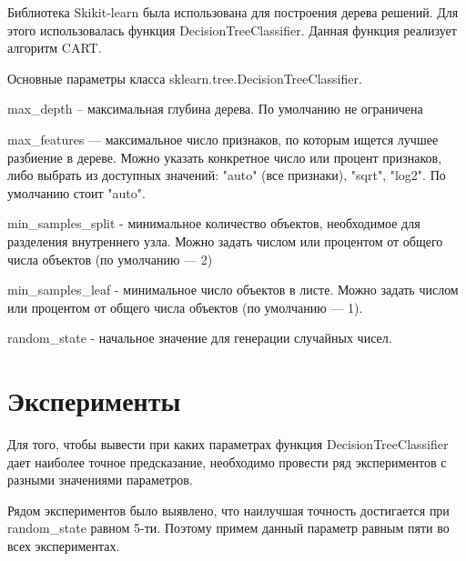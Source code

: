 \documentclass[a4paper,12pt]{article}
\begin{document}
	\vspace{0.5cm}
	Библиотека Skikit-learn была использована для построения дерева решений. Для этого использовалась функция DecisionTreeClassifier. Данная функция реализует алгоритм CART.
	
	\vspace{0.5cm}
	Основные параметры класса sklearn.tree.DecisionTreeClassifier.
	
	\vspace{0.5cm}
	max\_depth – максимальная глубина дерева. По умолчанию не ограничена
	
	\vspace{0.5cm}
	max\_features — максимальное число признаков, по которым ищется лучшее разбиение в дереве. Можно указать конкретное число или процент признаков, либо выбрать из доступных значений: "auto" (все признаки), "sqrt", "log2". По умолчанию стоит "auto".
	
	\vspace{0.5cm}
	min\_samples\_split - минимальное количество объектов, необходимое для разделения внутреннего узла. Можно задать числом или процентом от общего числа объектов (по умолчанию — 2)
	
	\vspace{0.5cm}
	min\_samples\_leaf - минимальное число объектов в листе. Можно задать числом или процентом от общего числа объектов (по умолчанию — 1).
	
	\vspace{0.5cm}
	random\_state - начальное значение для генерации случайных чисел.


	
\newpage\section{Эксперименты}
	Для того, чтобы вывести при каких параметрах функция DecisionTreeClassifier дает наиболее точное предсказание, необходимо провести ряд экспериментов с разными значениями параметров. 
	
	\vspace{0.5cm}
	Рядом экспериментов было выявлено, что наилучшая точность достигается при random\_state равном 5-ти. Поэтому примем данный параметр равным пяти во всех экспериментах.
	
\end{document}
